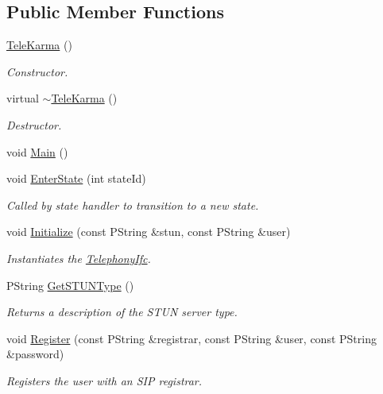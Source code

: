 \subsection*{Public Member Functions}
\begin{CompactItemize}
\item 
\hyperlink{classTeleKarma_e51315e12cf9e918a0eacce8333e298e}{TeleKarma} ()
\begin{CompactList}\small\item\em Constructor. \item\end{CompactList}\item 
virtual \hyperlink{classTeleKarma_5486e84d7320be3da1139e9d48d02401}{$\sim$TeleKarma} ()
\begin{CompactList}\small\item\em Destructor. \item\end{CompactList}\item 
void \hyperlink{classTeleKarma_addd554bf6335422cc896c894005a031}{Main} ()
\item 
void \hyperlink{classTeleKarma_22107597af9789cf4162ac2bb32f0482}{EnterState} (int stateId)
\begin{CompactList}\small\item\em Called by state handler to transition to a new state. \item\end{CompactList}\item 
void \hyperlink{classTeleKarma_94f24d2895a64c49d1d5daf9a5a40c7e}{Initialize} (const PString \&stun, const PString \&user)
\begin{CompactList}\small\item\em Instantiates the \hyperlink{classTelephonyIfc}{TelephonyIfc}. \item\end{CompactList}\item 
PString \hyperlink{classTeleKarma_394f0108ecd1628e510c79a5f84a8d7d}{GetSTUNType} ()
\begin{CompactList}\small\item\em Returns a description of the STUN server type. \item\end{CompactList}\item 
void \hyperlink{classTeleKarma_94c53557510b5373b400128ded8cb7a6}{Register} (const PString \&registrar, const PString \&user, const PString \&password)
\begin{CompactList}\small\item\em Registers the user with an SIP registrar. \item\end{CompactList}\item 

\end{CompactItemize}
